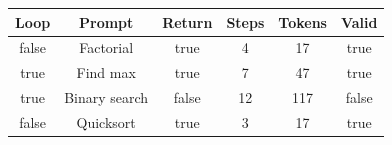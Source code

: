 \begin{table}[h]
\centering
\begin{tabular}{ |c|c|c|c|c|c| }
\hline
Loop & Prompt & Return & Steps & Tokens & Valid \\
\hline
false & Factorial & true & 4 & 17 & true \\
\hline
true & Find max & true & 7 & 47 & true \\
\hline
true & Binary search & false & 12 & 117 & false \\
\hline
false & Quicksort & true & 3 & 17 & true \\
\hline
\end{tabular}
\end{table}
